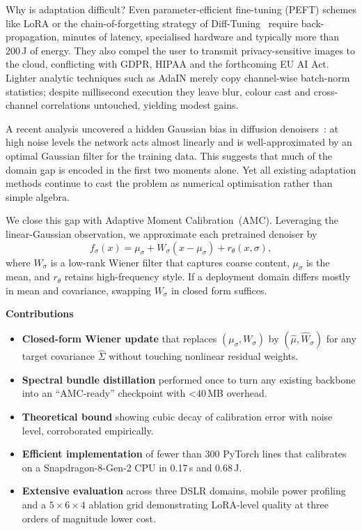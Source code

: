 \documentclass{article} %
\begin{document}
Why is adaptation difficult? Even parameter-efficient fine-tuning (PEFT) schemes like LoRA or the chain-of-forgetting strategy of Diff-Tuning~\cite{zhong_2024_diffusion} require back-propagation, minutes of latency, specialised hardware and typically more than 200\,J of energy. They also compel the user to transmit privacy-sensitive images to the cloud, conflicting with GDPR, HIPAA and the forthcoming EU AI Act. Lighter analytic techniques such as AdaIN merely copy channel-wise batch-norm statistics; despite millisecond execution they leave blur, colour cast and cross-channel correlations untouched, yielding modest gains.

A recent analysis uncovered a hidden Gaussian bias in diffusion denoisers~\cite{li_2024_understanding}: at high noise levels the network acts almost linearly and is well-approximated by an optimal Gaussian filter for the training data. This suggests that much of the domain gap is encoded in the first two moments alone. Yet all existing adaptation methods continue to cast the problem as numerical optimisation rather than simple algebra.

We close this gap with Adaptive Moment Calibration~(AMC). Leveraging the linear-Gaussian observation, we approximate each pretrained denoiser by
\[
f_{\sigma}(x)=\mu_{\sigma}+W_{\sigma}(x-\mu_{\sigma})+r_{\theta}(x,\sigma),
\]
where $W_{\sigma}$ is a low-rank Wiener filter that captures coarse content, $\mu_{\sigma}$ is the mean, and $r_{\theta}$ retains high-frequency style. If a deployment domain differs mostly in mean and covariance, swapping $W_{\sigma}$ in closed form suffices.

\textbf{Contributions}
\begin{itemize}
  \item\textbf{Closed-form Wiener update} that replaces $(\mu_{\sigma},W_{\sigma})$ by $(\hat{\mu},\hat W_{\sigma})$ for any target covariance $\hat\Sigma$ without touching nonlinear residual weights.
  \item\textbf{Spectral bundle distillation} performed once to turn any existing backbone into an ``AMC-ready'' checkpoint with \textless{}40\,MB overhead.
  \item\textbf{Theoretical bound} showing cubic decay of calibration error with noise level, corroborated empirically.
  \item\textbf{Efficient implementation} of fewer than 300 PyTorch lines that calibrates on a Snapdragon-8-Gen-2 CPU in 0.17\,s and 0.68\,J.
  \item\textbf{Extensive evaluation} across three DSLR domains, mobile power profiling and a $5\times6\times4$ ablation grid demonstrating LoRA-level quality at three orders of magnitude lower cost.
\end{itemize}
\end{document}
